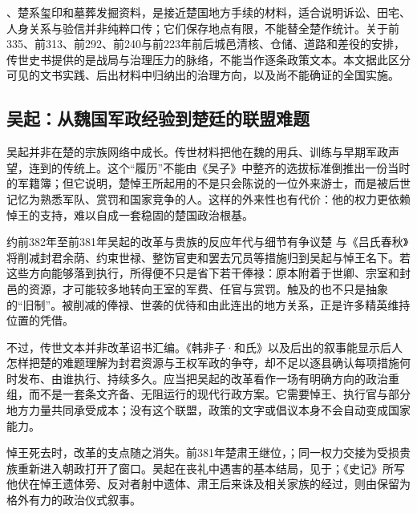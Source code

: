 \begin{sourcenote}
、楚系玺印和墓葬发掘资料，是接近楚国地方手续的材料，适合说明诉讼、田宅、人身关系与验信并非纯粹口传；它们保存地点有限，不能替全楚作统计。关于前335、前313、前292、前240与前223年前后城邑清核、仓储、道路和差役的安排，传世史书提供的是战局与治理压力的脉络，不能当作逐条政策文本。本文据此区分可见的文书实践、后出材料中归纳出的治理方向，以及尚不能确证的全国实施。
\end{sourcenote}

\subsection{吴起：从魏国军政经验到楚廷的联盟难题}

吴起并非在楚的宗族网络中成长。传世材料把他在魏的用兵、训练与早期军政声望，连到的传统上。这个“履历”不能由《吴子》中整齐的选拔标准倒推出一份当时的军籍簿；但它说明，楚悼王所起用的不是只会陈说的一位外来游士，而是被后世记忆为熟悉军队、赏罚和国家竞争的人。这样的外来性也有代价：他的权力更依赖悼王的支持，难以自成一套稳固的楚国政治根基。

\begin{event}{约前382年至前381年}{吴起的改革与贵族的反应}{年代与细节有争议}{楚}
与《吕氏春秋》将削减封君余荫、约束世禄、整饬官吏和罢去冗员等措施归到吴起与悼王名下。若这些方向能够落到执行，所得便不只是省下若干俸禄：原本附着于世卿、宗室和封邑的资源，才可能较多地转向王室的军费、任官与赏罚。触及的也不只是抽象的“旧制”。被削减的俸禄、世袭的优待和由此连出的地方关系，正是许多精英维持位置的凭借。

不过，传世文本并非改革诏书汇编。《韩非子·和氏》以及后出的叙事能显示后人怎样把楚的难题理解为封君资源与王权军政的争夺，却不足以逐县确认每项措施何时发布、由谁执行、持续多久。应当把吴起的改革看作一场有明确方向的政治重组，而不是一套条文齐备、无阻运行的现代行政方案。它需要悼王、执行官与部分地方力量共同承受成本；没有这个联盟，政策的文字或倡议本身不会自动变成国家能力。
\end{event}

悼王死去时，改革的支点随之消失。前381年楚肃王继位，；同一权力交接为受损贵族重新进入朝政打开了窗口。吴起在丧礼中遇害的基本结局，见于；《史记》所写他伏在悼王遗体旁、反对者射中遗体、肃王后来诛及相关家族的经过，则由保留为格外有力的政治仪式叙事。

